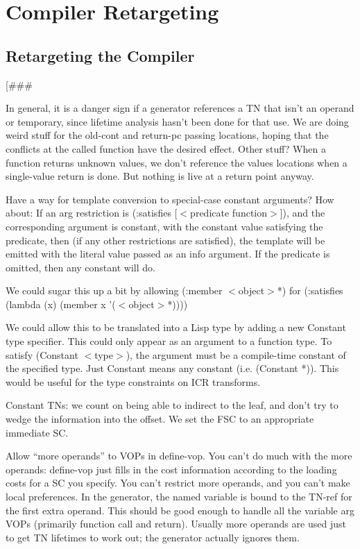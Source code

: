 \part{Compiler Retargeting}

\chapter{Retargeting the Compiler}
[\#\#\#

In general, it is a danger sign if a generator references a TN that isn't an
operand or temporary, since lifetime analysis hasn't been done for that use.
We are doing weird stuff for the old-cont and return-pc passing locations,
hoping that the conflicts at the called function have the desired effect.
Other stuff?  When a function returns unknown values, we don't reference the
values locations when a single-value return is done.  But nothing is live at a
return point anyway.



Have a way for template conversion to special-case constant arguments?  
How about:
    If an arg restriction is (:satisfies [$<$predicate function$>$]), and the
    corresponding argument is constant, with the constant value satisfying the
    predicate, then (if any other restrictions are satisfied), the template
    will be emitted with the literal value passed as an info argument.  If the
    predicate is omitted, then any constant will do.

    We could sugar this up a bit by allowing (:member $<$object$>$*) for
    (:satisfies (lambda (x) (member x '($<$object$>$*))))

We could allow this to be translated into a Lisp type by adding a new Constant
type specifier.  This could only appear as an argument to a function type.
To satisfy (Constant $<$type$>$), the argument must be a compile-time constant of
the specified type.  Just Constant means any constant (i.e. (Constant *)).
This would be useful for the type constraints on ICR transforms.


Constant TNs: we count on being able to indirect to the leaf, and don't try to
wedge the information into the offset.  We set the FSC to an appropriate
immediate SC.

    Allow ``more operands'' to VOPs in define-vop.  You can't do much with the
    more operands: define-vop just fills in the cost information according to
    the loading costs for a SC you specify.  You can't restrict more operands,
    and you can't make local preferences.  In the generator, the named variable
    is bound to the TN-ref for the first extra operand.  This should be good
    enough to handle all the variable arg VOPs (primarily function call and
    return).  Usually more operands are used just to get TN lifetimes to work
    out; the generator actually ignores them.

